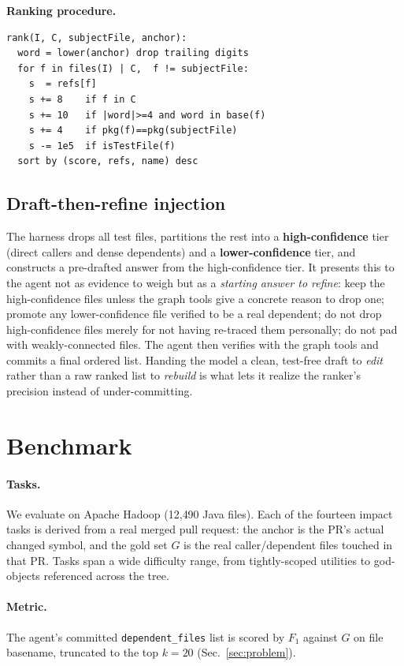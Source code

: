 \documentclass[11pt,twocolumn]{article}
\begin{document}
\noindent\footnotesize\textbf{Ranking procedure.}\normalsize
\begin{Verbatim}
rank(I, C, subjectFile, anchor):
  word = lower(anchor) drop trailing digits
  for f in files(I) | C,  f != subjectFile:
    s  = refs[f]
    s += 8    if f in C
    s += 10   if |word|>=4 and word in base(f)
    s += 4    if pkg(f)==pkg(subjectFile)
    s -= 1e5  if isTestFile(f)
  sort by (score, refs, name) desc
\end{Verbatim}

\subsection{Draft-then-refine injection}
The harness drops all test files, partitions the rest into a \textbf{high-confidence} tier
(direct callers and dense dependents) and a \textbf{lower-confidence} tier, and constructs a
pre-drafted answer from the high-confidence tier. It presents this to the agent not as evidence
to weigh but as a \emph{starting answer to refine}: keep the high-confidence files unless the
graph tools give a concrete reason to drop one; promote any lower-confidence file verified to be
a real dependent; do not drop high-confidence files merely for not having re-traced them
personally; do not pad with weakly-connected files. The agent then verifies with the graph tools
and commits a final ordered list. Handing the model a clean, test-free draft to \emph{edit}
rather than a raw ranked list to \emph{rebuild} is what lets it realize the ranker's precision
instead of under-committing.

\section{Benchmark}\label{sec:bench}

\paragraph{Tasks.} We evaluate on Apache Hadoop (12{,}490 Java files). Each of the fourteen
impact tasks is derived from a real merged pull request: the anchor is the PR's actual changed
symbol, and the gold set $G$ is the real caller/dependent files touched in that PR. Tasks span a
wide difficulty range, from tightly-scoped utilities to god-objects referenced across the tree.

\paragraph{Metric.} The agent's committed \texttt{dependent\_files} list is scored by $F_1$
against $G$ on file basename, truncated to the top $k{=}20$ (Sec.~\ref{sec:problem}).
\end{document}
